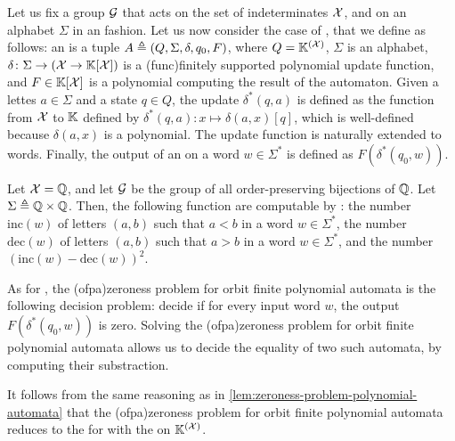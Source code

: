 \AP Let us fix a group $\mathcal{G}$ that acts on the set of indeterminates
$\mathcal{X}$, and on an alphabet $\Sigma$ in an 
fashion. Let us now consider the case of , that we define as follows: an  is a tuple $A \triangleq (Q, \Sigma, \delta, q_0, F)$, where $Q =
\mathbb{K}^{(\mathcal{X})}$, $\Sigma$ is an  alphabet, $\delta \colon
\Sigma \to (\mathcal{X} \to \mathbb{K}[\mathcal{X}])$ is a \kl(func){finitely supported}
polynomial update function, and $F \in \mathbb{K}[\mathcal{X}]$ is a polynomial
computing the result of the automaton. Given a lettes $a \in \Sigma$ and a
state $q \in Q$, the update $\delta^*(q,a)$ is defined as the function from
$\mathcal{X}$ to $\mathbb{K}$ defined by $\delta^*(q,a) \colon x \mapsto \delta(a,x)[ q ]$,
which is well-defined because $\delta(a,x)$ is a 
polynomial. The update function is naturally extended to words. Finally, the
output of an  on a word $w \in \Sigma^*$
is defined as $F(\delta^*(q_0, w))$.

\begin{example}
  \label{ex:orbit-finite-polynomial-automata}
  Let $\mathcal{X} = \mathbb{Q}$, and let $\mathcal{G}$ be the group of all
  order-preserving bijections of $\mathbb{Q}$.
  Let $\Sigma \triangleq \mathbb{Q} \times \mathbb{Q}$.
  Then, the following function are computable by 
  :
  the number $\mathrm{inc}(w)$ of letters $(a,b)$ such that $a < b$ in a word $w \in \Sigma^*$,
  the number $\mathrm{dec}(w)$ of letters $(a,b)$ such that $a > b$ in a word $w \in \Sigma^*$,
  and the number $(\mathrm{inc}(w) - \mathrm{dec}(w))^2$.
\end{example}

\AP As for , the \intro(ofpa){zeroness problem} for
orbit finite polynomial automata is the following decision problem: decide if
for every input word $w$, the output $F(\delta^*(q_0, w))$ is zero. Solving the
\kl(ofpa){zeroness problem} for orbit finite polynomial automata allows us to
decide the equality of two such automata, by computing their substraction. 

It follows from the same reasoning as in
\cref{lem:zeroness-problem-polynomial-automata} that the
\kl(ofpa){zeroness problem} for orbit finite polynomial automata reduces to the
 for  with the  on $\mathbb{K}^{(\mathcal{X})}$.

